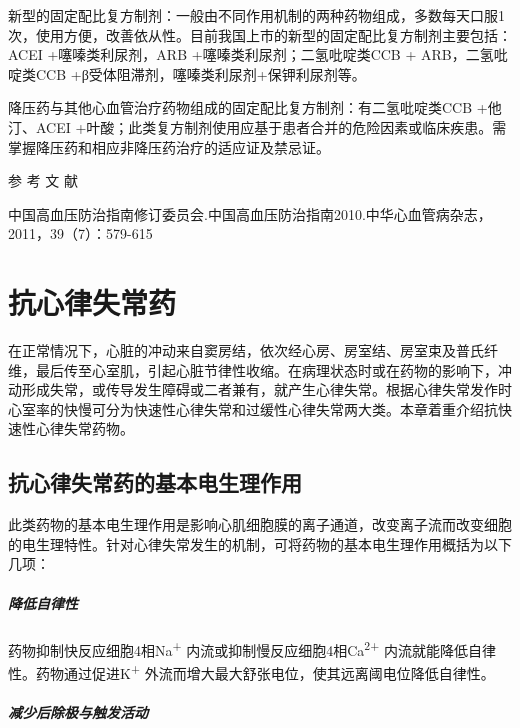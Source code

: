 新型的固定配比复方制剂：一般由不同作用机制的两种药物组成，多数每天口服1次，使用方便，改善依从性。目前我国上市的新型的固定配比复方制剂主要包括：ACEI
+噻嗪类利尿剂，ARB +噻嗪类利尿剂；二氢吡啶类CCB + ARB，二氢吡啶类CCB
+β受体阻滞剂，噻嗪类利尿剂+保钾利尿剂等。

降压药与其他心血管治疗药物组成的固定配比复方制剂：有二氢吡啶类CCB
+他汀、ACEI
+叶酸；此类复方制剂使用应基于患者合并的危险因素或临床疾患。需掌握降压药和相应非降压药治疗的适应证及禁忌证。

\protect\hypertarget{text00418.html}{}{}

\hypertarget{text00418.htmlux5cux23CHP17-3-10}{}
参 考 文 献

中国高血压防治指南修订委员会.中国高血压防治指南2010.中华心血管病杂志，2011，39（7）：579-615

\protect\hypertarget{text00419.html}{}{}

\chapter{抗心律失常药}

在正常情况下，心脏的冲动来自窦房结，依次经心房、房室结、房室束及普氏纤维，最后传至心室肌，引起心脏节律性收缩。在病理状态时或在药物的影响下，冲动形成失常，或传导发生障碍或二者兼有，就产生心律失常。根据心律失常发作时心室率的快慢可分为快速性心律失常和过缓性心律失常两大类。本章着重介绍抗快速性心律失常药物。

\section{抗心律失常药的基本电生理作用}

此类药物的基本电生理作用是影响心肌细胞膜的离子通道，改变离子流而改变细胞的电生理特性。针对心律失常发生的机制，可将药物的基本电生理作用概括为以下几项：

\paragraph{降低自律性}

药物抑制快反应细胞4相Na\textsuperscript{+}
内流或抑制慢反应细胞4相Ca\textsuperscript{2+}
内流就能降低自律性。药物通过促进K\textsuperscript{+}
外流而增大最大舒张电位，使其远离阈电位降低自律性。

\paragraph{减少后除极与触发活动}

